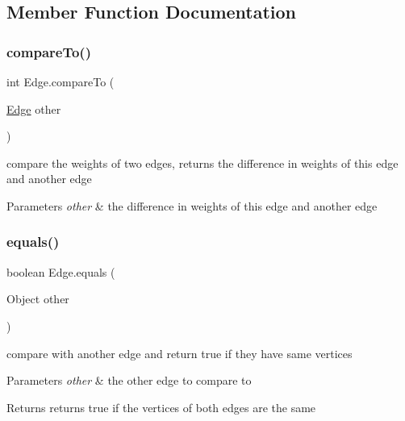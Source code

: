 \subsection{Member Function Documentation}
\mbox{\label{class_edge_a98faa9ff26104cffc051c241263b61c9}} 
\subsubsection{\texorpdfstring{compare\+To()}{compareTo()}}
{\footnotesize\ttfamily int Edge.\+compare\+To (\begin{DoxyParamCaption}\item[{\hyperlink{class_edge}{Edge}}]{other }\end{DoxyParamCaption})}



compare the weights of two edges, returns the difference in weights of this edge and another edge 


\begin{DoxyParams}{Parameters}
{\em other} & the difference in weights of this edge and another edge \\
\hline
\end{DoxyParams}
\mbox{\label{class_edge_a0c7e6548b7a43da81c0c0d6781d5ea07}} 
\subsubsection{\texorpdfstring{equals()}{equals()}}
{\footnotesize\ttfamily boolean Edge.\+equals (\begin{DoxyParamCaption}\item[{Object}]{other }\end{DoxyParamCaption})}



compare with another edge and return true if they have same vertices 


\begin{DoxyParams}{Parameters}
{\em other} & the other edge to compare to \\
\hline
\end{DoxyParams}
\begin{DoxyReturn}{Returns}
returns true if the vertices of both edges are the same 
\end{DoxyReturn}
\mbox{\label{class_edge_ab980e6d28be975d55e1ccffaffd173fd}} 
